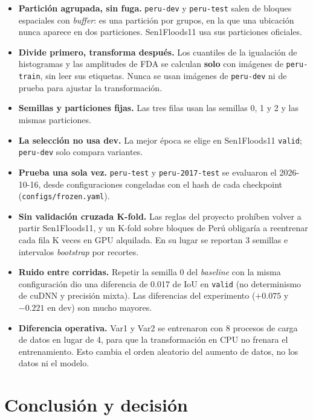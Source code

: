 \begin{itemize}
    \item \textbf{Partición agrupada, sin fuga.} \texttt{peru-\allowbreak{}dev} y \texttt{peru-\allowbreak{}test} salen de
    bloques espaciales con \textit{buffer}: es una partición por grupos, en la que una ubicación
    nunca aparece en dos particiones. Sen1Floods11 usa sus particiones oficiales.
    \item \textbf{Divide primero, transforma después.} Los cuantiles de la igualación de histogramas y
    las amplitudes de FDA se calculan \textbf{solo} con imágenes de \texttt{peru-\allowbreak{}train}, sin leer sus
    etiquetas. Nunca se usan imágenes de \texttt{peru-\allowbreak{}dev} ni de prueba para ajustar la
    transformación.
    \item \textbf{Semillas y particiones fijas.} Las tres filas usan las semillas 0, 1 y 2 y las
    mismas particiones.
    \item \textbf{La selección no usa dev.} La mejor época se elige en Sen1Floods11 \texttt{valid};
    \texttt{peru-\allowbreak{}dev} solo compara variantes.
    \item \textbf{Prueba una sola vez.} \texttt{peru-\allowbreak{}test} y \texttt{peru-\allowbreak{}2017-\allowbreak{}test} se evaluaron el
    2026-10-16, desde configuraciones congeladas con el hash de cada checkpoint
    (\texttt{configs/\allowbreak{}frozen.yaml}).
    \item \textbf{Sin validación cruzada K-fold.} Las reglas del proyecto prohíben volver a partir
    Sen1Floods11, y un K-fold sobre bloques de Perú obligaría a reentrenar cada fila K veces en GPU
    alquilada. En su lugar se reportan 3 semillas e intervalos \textit{bootstrap} por recortes.
    \item \textbf{Ruido entre corridas.} Repetir la semilla 0 del \textit{baseline} con la misma
    configuración dio una diferencia de 0.017 de IoU en \texttt{valid} (no determinismo de cuDNN y
    precisión mixta). Las diferencias del experimento ($+0.075$ y $-0.221$ en dev) son mucho mayores.
    \item \textbf{Diferencia operativa.} Var1 y Var2 se entrenaron con 8 procesos de carga de datos en
    lugar de 4, para que la transformación en CPU no frenara el entrenamiento. Esto cambia el orden
    aleatorio del aumento de datos, no los datos ni el modelo.
\end{itemize}

\section{Conclusión y decisión}

